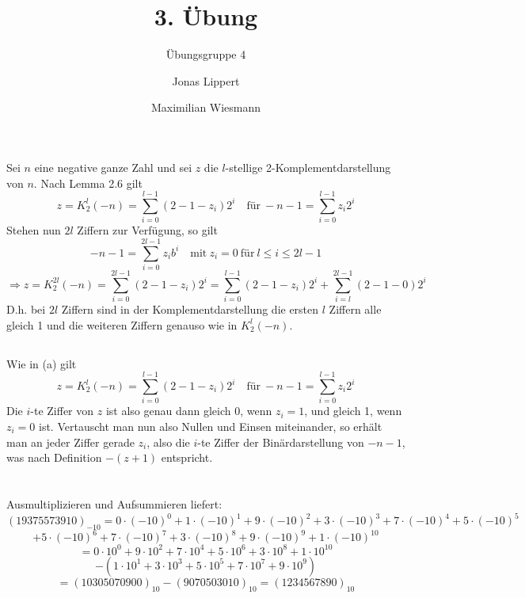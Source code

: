\documentclass[11pt]{scrartcl}
\title{3. Übung}
\author{Jonas Lippert \and Maximilian Wiesmann}
\subtitle{Übungsgruppe 4}
\theoremstyle{dotless}
\begin{document}
	\maketitle
	\section{}
	\subsection{}
	\section{}
	\subsection{}
		Sei $n$ eine negative ganze Zahl und sei $z$ die $l$-stellige 2-Komplementdarstellung von $n$. Nach Lemma 2.6 gilt
		$$ z = K_2^l(-n) = \sum_{i=0}^{l-1}(2-1-z_i)2^i \quad\text{für}~-n-1=\sum_{i=0}^{l-1}z_i2^i $$ 
		Stehen nun $2l$ Ziffern zur Verfügung, so gilt
		$$-n-1=\sum_{i=0}^{2l-1}z_ib^i\quad \text{mit}~z_i=0~\text{für}~l\le i\le 2l-1$$
		$$\Rightarrow z = K_2^{2l}(-n) = \sum_{i=0}^{2l-1}(2-1-z_i)2^i = \sum_{i=0}^{l-1}(2-1-z_i)2^i + \sum_{i=l}^{2l-1}(2-1-0)2^i$$
		D.h. bei $2l$ Ziffern sind in der Komplementdarstellung die ersten $l$ Ziffern alle gleich 1 und die weiteren Ziffern genauso wie in $K_2^{l}(-n)$.
	\subsection{}
		Wie in (a) gilt
		$$ z = K_2^l(-n) = \sum_{i=0}^{l-1}(2-1-z_i)2^i \quad\text{für}~-n-1=\sum_{i=0}^{l-1}z_i2^i $$ 
		Die $i$-te Ziffer von $z$ ist also genau dann gleich 0, wenn $z_i=1$, und gleich 1, wenn $z_i=0$ ist. Vertauscht man nun also Nullen und Einsen miteinander, so erhält man an jeder Ziffer gerade $z_i$, also die $i$-te Ziffer der Binärdarstellung von $-n-1$, was nach Definition $-(z+1)$ entspricht.
	\section{}
	\subsection{}
		Ausmultiplizieren und Aufsummieren liefert:
		$$(19375573910)_{-10}=0\cdot (-10)^0+1\cdot (-10)^1+9\cdot (-10)^2 + 3\cdot (-10)^3+7\cdot (-10)^4+5\cdot(-10)^5$$$$+5\cdot (-10)^6+7\cdot (-10)^7+3\cdot (-10)^8+9\cdot (-10)^9 +1\cdot(-10)^{10}$$
		$$=0\cdot 10^0+9\cdot 10^2+7\cdot 10^4+5\cdot 10^6+3\cdot 10^8 +1\cdot10^{10}$$
		$$-(1\cdot 10^1+3\cdot 10^3+5\cdot 10^5+7\cdot 10^7+9\cdot 10^9)$$
		$$=(10305070900)_{10}-(9070503010)_{10}=(1234567890)_{10}$$
\end{document}
